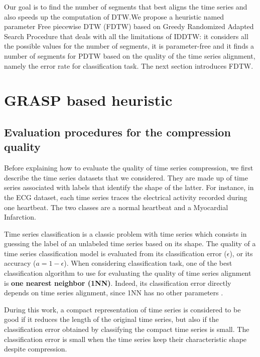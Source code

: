 Our goal is to find the number of segments that best aligns the time series and also speeds up the computation of DTW.We propose a  heuristic named parameter Free piecewise DTW (FDTW) based on Greedy Randomized Adapted Search Procedure that deals with all the limitations of IDDTW: it considers all the possible values for the number of segments, it is parameter-free and it finds a number of segments for PDTW based on the quality of  the time series alignment, namely the error rate for classification task. The next section introduces FDTW.




\section{GRASP based heuristic}
\label{sec:3}


\subsection{ Evaluation procedures for the compression quality}
Before explaining how to evaluate the quality of time series compression, we
first describe the time series datasets that we considered. They are
made up of time series associated with labels that identify the shape of the
latter. For instance, in the ECG dataset, each time series traces the
electrical activity recorded during one heartbeat. The two classes are a normal
heartbeat and a Myocardial Infarction. 

 Time series classification is a classic problem with time
series which consists in guessing the label of an unlabeled time series  based on its shape.
The quality of a time series classification model is evaluated from its classification error ($\epsilon$), or its accuracy ($a = 1 - \epsilon$).  When considering classification task, one of the
best classification algorithm to use for evaluating the quality of time series
alignment is \textbf{one nearest neighbor (1NN)}. Indeed,  its classification
error directly depends on time series alignment, since 1NN has no other parameters \cite{wang2013experimental}.

During this work, a compact representation of time series  is considered to be good
if it reduces the length of the original time series, but also if the classification error
obtained by classifying the compact time series is small. The classification error is small
when the time series keep their characteristic shape despite compression.   




